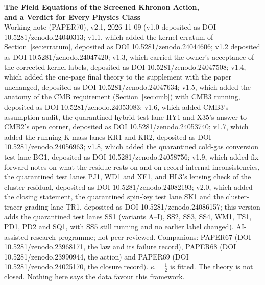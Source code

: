 \documentclass[10pt]{article}
\begin{document}
\begin{center}
{\Large\bfseries The Field Equations of the Screened Khronon Action,\\ and a Verdict for Every Physics Class}\\[6pt]
{\small Working note (PAPER70), v2.1, 2026-11-09 (v1.0 deposited as DOI 10.5281/zenodo.24040313; v1.1, which added the kernel erratum of Section~\ref{sec:erratum}, deposited as DOI 10.5281/zenodo.24044606; v1.2 deposited as DOI 10.5281/zenodo.24047420; v1.3, which carried the owner's acceptance of the corrected-kernel labels, deposited as DOI 10.5281/zenodo.24047508; v1.4, which added the one-page final theory to the supplement with the paper unchanged, deposited as DOI 10.5281/zenodo.24047634; v1.5, which added the anatomy of the CMB requirement (Section~\ref{sec:cmb}) with CMB3 running, deposited as DOI 10.5281/zenodo.24053083; v1.6, which added CMB3's assumption audit, the quarantined hybrid test lane HY1 and X35's answer to CMB2's open corner, deposited as DOI 10.5281/zenodo.24053740; v1.7, which added the running K-mass lanes KR1 and KR2, deposited as DOI 10.5281/zenodo.24056963; v1.8, which added the quarantined cold-gas conversion test lane BG1, deposited as DOI 10.5281/zenodo.24058756; v1.9, which added fix-forward notes on what the residue rests on and on record-internal inconsistencies, the quarantined test lanes PJ1, WD1 and XF1, and HL3's lensing check of the cluster residual, deposited as DOI 10.5281/zenodo.24082193; v2.0, which added the closing statement, the quarantined spin-key test lane SK1 and the cluster-tracer grading lane TR1, deposited as DOI 10.5281/zenodo.24086157; this version adds the quarantined test lanes SS1 (variants A--I), SS2, SS3, SS4, WM1, TS1, PD1, PD2 and SQ1, with SS5 still running and no earlier label changed). AI-assisted research programme; not peer reviewed.
Companions: PAPER67 (DOI 10.5281/zenodo.23968171, the law and its failure record), PAPER68 (DOI 10.5281/zenodo.23990944, the action) and PAPER69 (DOI 10.5281/zenodo.24025170, the closure record).
$\kappa=\tfrac12$ is fitted. The theory is not closed. Nothing here says the data favour this framework.}
\end{center}
\end{document}
